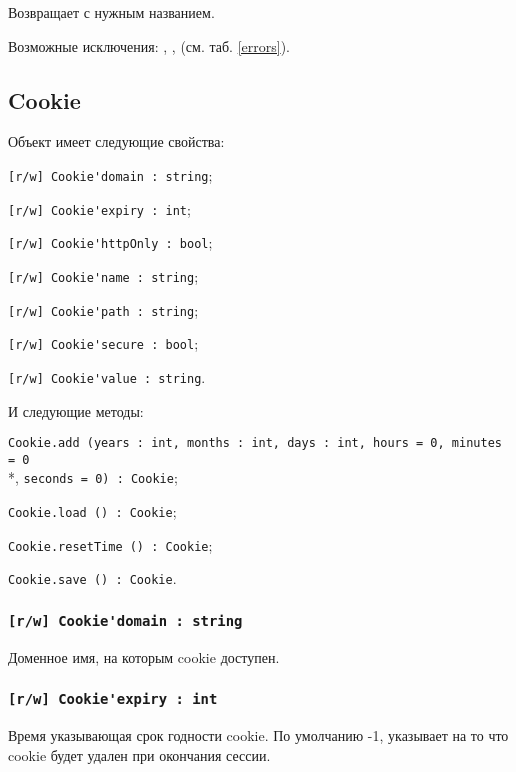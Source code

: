 Возвращает \cookie{} с нужным названием.

Возможные исключения: , ,  (см. таб. \ref{errors}).

\subsection{{\color{orange} Cookie}}

Объект \cookie{} имеет следующие свойства:
\begin{icItems}
	\item \lstinline|[r/w] Cookie'domain : string|;
	\item \lstinline|[r/w] Cookie'expiry : int|;
	\item \lstinline|[r/w] Cookie'httpOnly : bool|;
	\item \lstinline|[r/w] Cookie'name : string|;
	\item \lstinline|[r/w] Cookie'path : string|;
	\item \lstinline|[r/w] Cookie'secure : bool|;
	\item \lstinline|[r/w] Cookie'value : string|.
\end{icItems}

И следующие методы:
\begin{icItems}
	\item \lstinline|Cookie.add (years : int, months : int, days : int, hours = 0, minutes = 0|\\*, \lstinline|seconds = 0) : Cookie|;
	\item \lstinline|Cookie.load () : Cookie|;
	\item \lstinline|Cookie.resetTime () : Cookie|;
	\item \lstinline|Cookie.save () : Cookie|.
\end{icItems}

\subsubsection{\lstinline|[r/w] Cookie'domain : string|}

Доменное имя, на которым cookie доступен.

\subsubsection{\lstinline|[r/w] Cookie'expiry : int|}

Время указывающая срок годности cookie. По умолчанию -1, указывает на то что cookie будет удален при окончания сессии.

